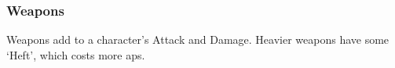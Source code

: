 \subsubsection*{Weapons}

Weapons add to a character's Attack and Damage.
Heavier weapons have some `Heft', which costs more \glspl{ap}.

